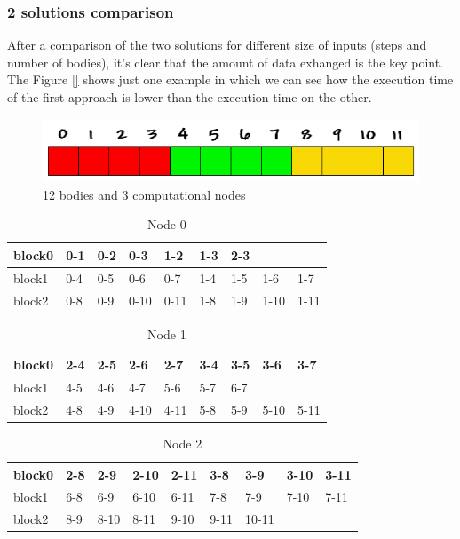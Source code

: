 \documentclass[a4paper]{article}
\begin{document}
\subsubsection{2 solutions comparison}
\label{sec:sol_comp}
After a comparison of the two solutions for different size of inputs (steps and number of bodies), it's clear that the amount of data exhanged is the key point. The Figure \ref{} shows just one example in which we can see how the execution time of the first approach is lower than the execution time on the other.




\begin{figure}[ht]
  \centering\includegraphics[width=0.6\linewidth]{array_procs_3}
  \caption{12 bodies and 3 computational nodes}
  \label{fig:3nodes}
\end{figure}
\FloatBarrier

\begin{table}[]
\centering
\caption{Node 0}
\label{my-label}
\begin{tabular}{l|llllllll}
block0 & 0-1 & 0-2 & 0-3  & 1-2  & 1-3 & 2-3 &      &      \\ \hline
block1 & 0-4 & 0-5 & 0-6  & 0-7  & 1-4 & 1-5 & 1-6  & 1-7  \\ \hline
block2 & 0-8 & 0-9 & 0-10 & 0-11 & 1-8 & 1-9 & 1-10 & 1-11
\end{tabular}
\end{table}

\begin{table}[]
\centering
\caption{Node 1}
\label{my-label}
\begin{tabular}{l|llllllll}
block0 & 2-4 & 2-5 & 2-6  & 2-7  & 3-4 & 3-5 & 3-6  & 3-7  \\ \hline
block1 & 4-5 & 4-6 & 4-7  & 5-6  & 5-7 & 6-7 &      &      \\ \hline
block2 & 4-8 & 4-9 & 4-10 & 4-11 & 5-8 & 5-9 & 5-10 & 5-11
\end{tabular}
\end{table}

\begin{table}[]
\centering
\caption{Node 2}
\label{my-label}
\begin{tabular}{l|llllllll}
block0 & 2-8 & 2-9  & 2-10 & 2-11 & 3-8  & 3-9   & 3-10 & 3-11 \\ \hline
block1 & 6-8 & 6-9  & 6-10 & 6-11 & 7-8  & 7-9   & 7-10 & 7-11 \\ \hline
block2 & 8-9 & 8-10 & 8-11 & 9-10 & 9-11 & 10-11 &      &     
\end{tabular}
\end{table}
\end{document}
